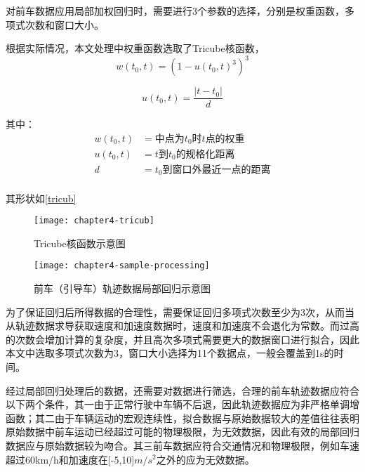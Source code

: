 对前车数据应用局部加权回归时，需要进行3个参数的选择，分别是权重函数，多项式次数和窗口大小。

根据实际情况，本文处理中权重函数选取了Tricube核函数，
\begin{equation}
w(t_0,t)=(1-u(t_0,t)^3)^3
\end{equation}

\begin{equation}
u(t_0,t)=\frac{\left | t-t_0 \right |}{d}
\end{equation}

其中：
\begin{displaymath}
{\begin{aligned}
w(t_0,t)&=\text{中点为}t_0\text{时}t\text{点的权重}\\
u(t_0,t)&=t\text{到}t_0\text{的规格化距离}\\
d&=t_0\text{到窗口外最近一点的距离}\\
\end{aligned}}
\end{displaymath}



其形状如\autoref{tricub}

\begin{figure}[htbp]
\begin{minipage}[t]{0.48\linewidth}
\centering
\texttt{[image: chapter4-tricub]}
\caption{Tricube核函数示意图}
\label{tricub}
\end{minipage}%
\hspace*{0.04\linewidth}
\begin{minipage}[t]{0.48\linewidth}
\centering
\texttt{[image: chapter4-sample-processing]}
\caption{前车（引导车）轨迹数据局部回归示意图}
\label{sample-processing}
\end{minipage}
\end{figure}


为了保证回归后所得数据的合理性，需要保证回归多项式次数至少为3次，从而当从轨迹数据求导获取速度和加速度数据时，速度和加速度不会退化为常数。而过高的次数会增加计算的复杂度，并且高次多项式需要更大的数据窗口进行拟合，因此本文中选取多项式次数为3，窗口大小选择为11个数据点，一般会覆盖到1s的时间。


经过局部回归处理后的数据，还需要对数据进行筛选，合理的前车轨迹数据应符合以下两个条件，其一由于正常行驶中车辆不后退，因此轨迹数据应为非严格单调增函数；其二由于车辆运动的宏观连续性，拟合数据与原始数据较大的差值往往表明原始数据中前车运动已经超过可能的物理极限，为无效数据，因此有效的局部回归数据应与原始数据较为吻合。其三前车数据应符合交通情况和物理极限，例如车速超过60km/h和加速度在[-5,10]$m/s^2$之外的应为无效数据。


